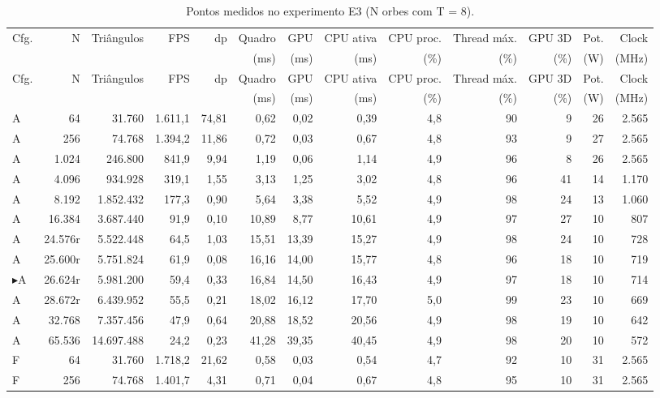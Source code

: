 {\scriptsize
\setlength{\tabcolsep}{2.6pt}
\begin{longtable}{l r r r r r r r r r r r r}
\caption{Pontos medidos no experimento E3 (N orbes com T = 8).}\label{tab:pontos_e3}\\
\toprule
Cfg. & N & Triângulos & FPS & dp & Quadro & GPU & CPU ativa & CPU proc. & Thread máx. & GPU 3D & Pot. & Clock \\
 & & & & & (ms) & (ms) & (ms) & (\%) & (\%) & (\%) & (W) & (MHz) \\
\midrule
\endfirsthead
\toprule
Cfg. & N & Triângulos & FPS & dp & Quadro & GPU & CPU ativa & CPU proc. & Thread máx. & GPU 3D & Pot. & Clock \\
 & & & & & (ms) & (ms) & (ms) & (\%) & (\%) & (\%) & (W) & (MHz) \\
\midrule
\endhead
A & 64 & 31.760 & 1.611,1 & 74,81 & 0,62 & 0,02 & 0,39 & 4,8 & 90 & 9 & 26 & 2.565 \\
A & 256 & 74.768 & 1.394,2 & 11,86 & 0,72 & 0,03 & 0,67 & 4,8 & 93 & 9 & 27 & 2.565 \\
A & 1.024 & 246.800 & 841,9 & 9,94 & 1,19 & 0,06 & 1,14 & 4,9 & 96 & 8 & 26 & 2.565 \\
A & 4.096 & 934.928 & 319,1 & 1,55 & 3,13 & 1,25 & 3,02 & 4,8 & 96 & 41 & 14 & 1.170 \\
A & 8.192 & 1.852.432 & 177,3 & 0,90 & 5,64 & 3,38 & 5,52 & 4,9 & 98 & 24 & 13 & 1.060 \\
A & 16.384 & 3.687.440 & 91,9 & 0,10 & 10,89 & 8,77 & 10,61 & 4,9 & 97 & 27 & 10 & 807 \\
A & 24.576r & 5.522.448 & 64,5 & 1,03 & 15,51 & 13,39 & 15,27 & 4,9 & 98 & 24 & 10 & 728 \\
A & 25.600r & 5.751.824 & 61,9 & 0,08 & 16,16 & 14,00 & 15,77 & 4,8 & 96 & 18 & 10 & 719 \\
$\blacktriangleright$A & 26.624r & 5.981.200 & 59,4 & 0,33 & 16,84 & 14,50 & 16,43 & 4,9 & 97 & 18 & 10 & 714 \\
A & 28.672r & 6.439.952 & 55,5 & 0,21 & 18,02 & 16,12 & 17,70 & 5,0 & 99 & 23 & 10 & 669 \\
A & 32.768 & 7.357.456 & 47,9 & 0,64 & 20,88 & 18,52 & 20,56 & 4,9 & 98 & 19 & 10 & 642 \\
A & 65.536 & 14.697.488 & 24,2 & 0,23 & 41,28 & 39,35 & 40,45 & 4,9 & 98 & 20 & 10 & 572 \\
\midrule
F & 64 & 31.760 & 1.718,2 & 21,62 & 0,58 & 0,03 & 0,54 & 4,7 & 92 & 10 & 31 & 2.565 \\
F & 256 & 74.768 & 1.401,7 & 4,31 & 0,71 & 0,04 & 0,67 & 4,8 & 95 & 10 & 31 & 2.565 \\

\end{longtable}}
